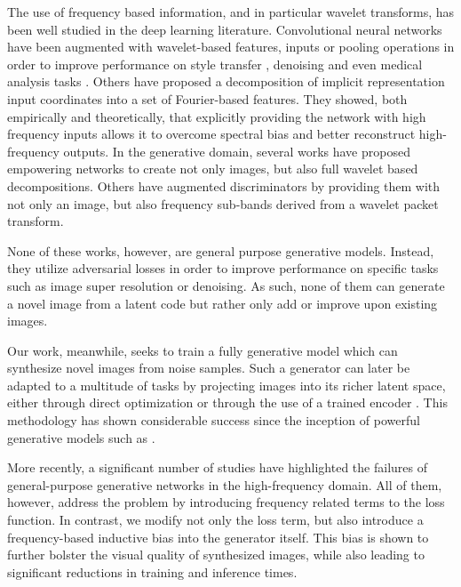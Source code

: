 \documentclass[final]{CVPR2021/cvpr}
\begin{document}
The use of frequency based information, and in particular wavelet transforms, has been well studied in the deep learning literature. Convolutional neural networks have been augmented with wavelet-based features, inputs or pooling operations \citep{gao2016hybrid, liu2019multi, williams2018wavelet} in order to improve performance on style transfer \citep{yoo2019photorealistic}, denoising \citep{liu2020wavelet} and even medical analysis tasks \citep{kang2017deep}. Others \citep{tancik2020fourier,mildenhall2020nerf} have proposed a decomposition of implicit representation input coordinates into a set of Fourier-based features. They showed, both empirically and theoretically, that explicitly providing the network with high frequency inputs allows it to overcome spectral bias and better reconstruct high-frequency outputs. 
In the generative domain, several works \citep{huang2019wavelet, wang2020multi, zhang2019super} have proposed empowering networks to create not only images, but also full wavelet based decompositions. Others \citep{liu2019attribute, wang2020multi} have augmented discriminators by providing them with not only an image, but also frequency sub-bands derived from a wavelet packet transform.

None of these works, however, are general purpose generative models. Instead, they utilize adversarial losses in order to improve performance on specific tasks such as image super resolution or denoising. As such, none of them can generate a novel image from a latent code but rather only add or improve upon existing images.

Our work, meanwhile, seeks to train a fully generative model which can synthesize novel images from noise samples. Such a generator can later be adapted to a multitude of tasks by projecting images into its richer latent space, either through direct optimization \cite{abdal2019image2stylegan} or through the use of a trained encoder \citep{richardson2020encoding}. This methodology has shown considerable success since the inception of powerful generative models such as \citet{karras_style-based_2019}.

More recently, a significant number of studies \citep{chen2020ssd, durall2020watch} have highlighted the failures of general-purpose generative \mbox{networks} in the high-frequency domain. All of them, however, address the problem by introducing frequency related terms to the loss function. In contrast, we modify not only the loss term, but also introduce a frequency-based inductive bias into the generator itself. This bias is shown to further bolster the visual quality of synthesized images, while also leading to significant reductions in training and \mbox{inference} times.
\end{document}
